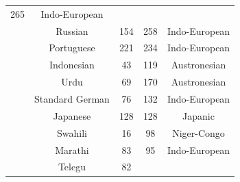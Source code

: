 {\begin{tabular}{|c|c|c|c|c|}
265 &
	

Indo-European \\

	\thetablecount\stepcounter{tablecount} &
Russian &
	

154 &
	

258 &
	

Indo-European \\

	\thetablecount\stepcounter{tablecount} &
Portuguese &
	

221 &
	

234 &
	

Indo-European \\
	\thetablecount\stepcounter{tablecount} &

Indonesian &
	

43 &
	

119 &
	

Austronesian \\

	\thetablecount\stepcounter{tablecount} &
Urdu &
	

69 &
	

170 &
	

Austronesian \\
	\thetablecount\stepcounter{tablecount} &

Standard German &
	

76 &
	

132 &
	

Indo-European \\
	\thetablecount\stepcounter{tablecount} &

Japanese &
	

128 &
	

128 &
	

Japanic \\

	\thetablecount\stepcounter{tablecount} &
Swahili &
	

16 &
	

98 &
	

Niger-Congo \\
	\thetablecount\stepcounter{tablecount} &

Marathi &
	

83 &
	

95 &
	

Indo-European \\

	\thetablecount\stepcounter{tablecount} &
Telegu &
	

82 &
	


\end{tabular}}
